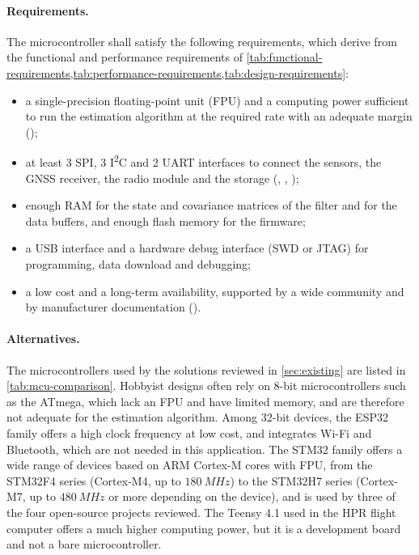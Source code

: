 \paragraph{Requirements.} The microcontroller shall satisfy the following requirements, which derive from the functional and performance requirements of \cref{tab:functional-requirements,tab:performance-requirements,tab:design-requirements}:
\begin{itemize}
    \item a single-precision floating-point unit (FPU) and a computing power sufficient to run the estimation algorithm at the required rate with an adequate margin (); 
    \item at least 3 SPI, 3 I\textsuperscript{2}C and 2 UART interfaces to connect the sensors, the GNSS receiver, the radio module and the storage (, , );
    \item enough RAM for the state and covariance matrices of the filter and for the data buffers, and enough flash memory for the firmware; %
    \item a USB interface and a hardware debug interface (SWD or JTAG) for programming, data download and debugging;
    \item a low cost and a long-term availability, supported by a wide community and by manufacturer documentation (). %
\end{itemize}

\paragraph{Alternatives.} The microcontrollers used by the solutions reviewed in \cref{sec:existing} are listed in \cref{tab:mcu-comparison}. Hobbyist designs often rely on 8-bit microcontrollers such as the ATmega, which lack an FPU and have limited memory, and are therefore not adequate for the estimation algorithm. Among 32-bit devices, the ESP32 family offers a high clock frequency at low cost, and integrates Wi-Fi and Bluetooth, which are not needed in this application. The STM32 family offers a wide range of devices based on ARM Cortex-M cores with FPU, from the STM32F4 series (Cortex-M4, up to $\SI{180}{MHz}$) to the STM32H7 series (Cortex-M7, up to $\SI{480}{MHz}$ or more depending on the device), and is used by three of the four open-source projects reviewed. The Teensy 4.1 used in the HPR flight computer offers a much higher computing power, but it is a development board and not a bare microcontroller.

